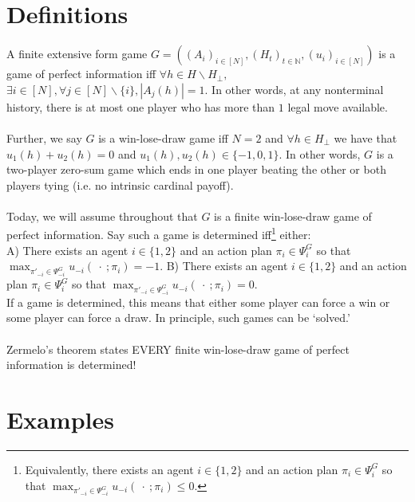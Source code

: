 \documentclass[11pt]{article}
\title{}
\date{}
\theoremstyle{definition}
\theoremstyle{plain}
\begin{document}
\section{Definitions}

A finite extensive form game $G=((A_i)_{i \in [N]}, (H_t)_{t \in \mathbb{N}}, (u_i)_{i \in [N]})$ is a game of perfect information iff $\forall h \in H\backslash H_{\bot},$ $\exists i \in [N], \forall j \in [N] \backslash \{i\}, |A_j(h)|=1$. In other words, at any nonterminal history, there is at most one player who has more than $1$ legal move available.
\\
\\
Further, we say $G$ is a win-lose-draw game iff $N=2$ and $\forall h \in H_{\bot}$ we have that $u_1(h)+u_2(h)=0$  and $u_1(h),u_2(h) \in \{-1,0,1\}$. In other words, $G$ is a two-player zero-sum game which ends in one player beating the other or both players tying (i.e. no intrinsic cardinal payoff). 
\\
\\
Today, we will assume throughout that $G$ is a finite win-lose-draw game of perfect information. Say such a game is determined iff\footnote{Equivalently, there exists an agent $i\in\{1,2\}$ and an action plan $\pi_i \in \Psi^G_i$ so that $\max_{\pi'_{-i} \in \Psi^G_{-i}} u_{-i}(\ \cdot \ ; \pi_i) \leq 0.$}  either:
\\
A) There exists an agent $i \in \{1,2\}$ and an action plan $\pi_i \in \Psi^G_i$ so that  $\max_{\pi'_{-i} \in \Psi^G_{-i}} u_{-i}(\ \cdot \ ; \pi_i)=-1.$
B) There exists an agent $i \in \{1,2\}$ and an action plan $\pi_i \in \Psi^G_i$ so that $\max_{\pi'_{-i} \in \Psi^G_{-i}} u_{-i}(\ \cdot \ ; \pi_i)=0.$
\\
If a game is determined, this means that either some player can force a win or some player can force a draw. In principle, such games can be `solved.'
\\
\\
Zermelo's theorem states EVERY finite win-lose-draw game of perfect information is determined!

\section{Examples}
\end{document}
